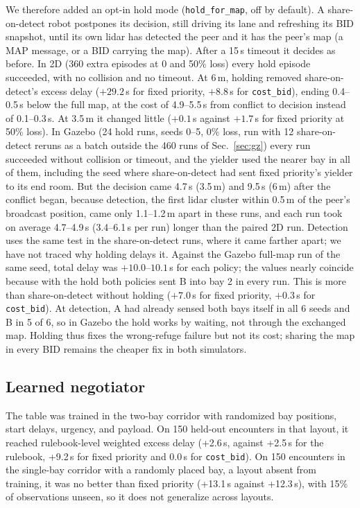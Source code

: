 \documentclass[letterpaper,journal]{IEEEtran}
\newcommand{\cb}{\texttt{cost\_bid}}
\begin{document}
We therefore added an opt-in hold mode (\texttt{hold\_for\_map}, off by default). A share-on-detect robot postpones its decision, still driving its lane and refreshing its BID snapshot, until its own lidar has detected the peer and it has the peer's map (a MAP message, or a BID carrying the map). After a 15\,s timeout it decides as before. In 2D (360 extra episodes at 0 and 50\% loss) every hold episode succeeded, with no collision and no timeout. At 6\,m, holding removed share-on-detect's excess delay ($+29.2$\,s for fixed priority, $+8.8$\,s for \cb), ending 0.4--0.5\,s below the full map, at the cost of 4.9--5.5\,s from conflict to decision instead of 0.1--0.3\,s. At 3.5\,m it changed little ($+0.1$\,s against $+1.7$\,s for fixed priority at 50\% loss). In Gazebo (24 hold runs, seeds 0--5, 0\% loss, run with 12 share-on-detect reruns as a batch outside the 460 runs of Sec.~\ref{sec:gz}) every run succeeded without collision or timeout, and the yielder used the nearer bay in all of them, including the seed where share-on-detect had sent fixed priority's yielder to its end room. But the decision came 4.7\,s (3.5\,m) and 9.5\,s (6\,m) after the conflict began, because detection, the first lidar cluster within 0.5\,m of the peer's broadcast position, came only 1.1--1.2\,m apart in these runs, and each run took on average 4.7--4.9\,s (3.4--6.1\,s per run) longer than the paired 2D run. Detection uses the same test in the share-on-detect runs, where it came farther apart; we have not traced why holding delays it. %
Against the Gazebo full-map run of the same seed, total delay was $+10.0$--$10.1$\,s for each policy; the values nearly coincide because with the hold both policies sent B into bay 2 in every run. This is more than share-on-detect without holding ($+7.0$\,s for fixed priority, $+0.3$\,s for \cb). At detection, A had already sensed both bays itself in all 6 seeds and B in 5 of 6, so in Gazebo the hold works by waiting, not through the exchanged map. Holding thus fixes the wrong-refuge failure but not its cost; sharing the map in every BID remains the cheaper fix in both simulators.

\subsection{Learned negotiator}\label{sec:learned}
The table was trained in the two-bay corridor with randomized bay positions, start delays, urgency, and payload. On 150 held-out encounters in that layout, it reached rulebook-level weighted excess delay (+2.6\,s, against +2.5\,s for the rulebook, +9.2\,s for fixed priority and 0.0\,s for \cb). On 150 encounters in the single-bay corridor with a randomly placed bay, a layout absent from training, it was no better than fixed priority (+13.1\,s against +12.3\,s), with 15\% of observations unseen, so it does not generalize across layouts.
\end{document}

